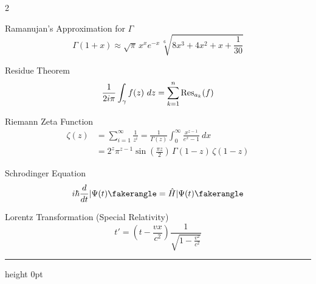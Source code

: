\begin{multicols*}{2}
\vfill

Ramanujan's Approximation for $\Gamma$
\[
\Gamma(1+x)\approx\sqrt\pi\,x^xe^{-x}\,\sqrt[6]{8x^3+4x^2+x+\frac1{30}}
\]

\vfill

Residue Theorem
\[
\frac1{2i\pi}\int_{\gamma}f(z)\ dz=\sum_{k=1}^n\Res_{a_k}(f)
\]

\vfill

Riemann Zeta Function
\begin{align*}
\zeta(z)&=\sum_{i=1}^\infty\frac1{z^i}
  =\frac1{\Gamma(z)}\int_0^\infty\frac{x^{z-1}}{e^x-1}\ dx\\
  &=2^z\pi^{z-1}\sin\left(\frac{\pi z}2\right)\,\Gamma(1-z)\,\zeta(1-z)
\end{align*}

\vfill

Schrodinger Equation
\[
i\hbar\frac d{dt}|\Psi(t)\fakerangle=\hat H|\Psi(t)\fakerangle
\]

\vfill

Lorentz Transformation (Special Relativity)
\belowdisplayskip=0pt\relax
\belowdisplayshortskip=0pt\relax
\[
t'=\left(t-\frac{vx}{c^2}\right)\frac1{\sqrt{1-\frac{v^2}{c^2}}}
\]
\hrule height 0pt

\end{multicols*}
\endinput
